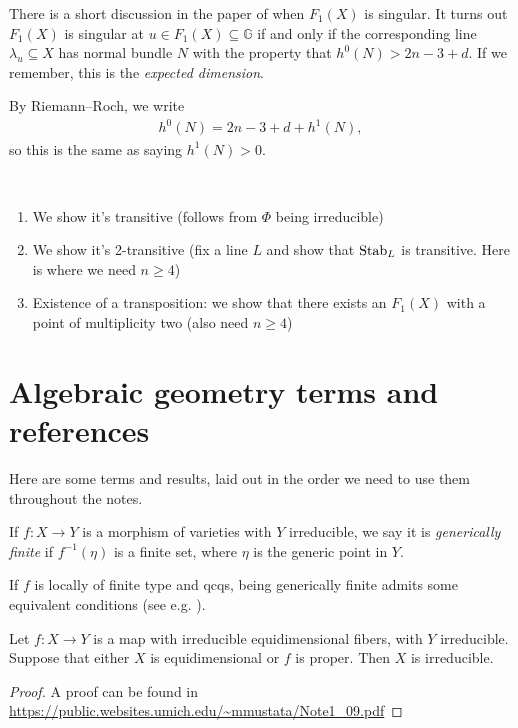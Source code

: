 \documentclass[11pt]{amsart}
\begin{document}
\begin{remark} There is a short discussion in the paper of when $F_1(X)$ is singular. It turns out $F_1(X)$ is singular at $u \in F_1(X) \subseteq \mathbb{G}$ if and only if the corresponding line $\lambda_u \subseteq X$ has normal bundle $N$ with the property that $h^0(N) > 2n-3+d$. If we remember, this is the \textit{expected dimension}.

By Riemann--Roch, we write
\begin{align*}
    h^0(N) = 2n-3+d + h^1(N),
\end{align*}
so this is the same as saying $h^1(N)>0$.
\end{remark}

\begin{remark} \,
\begin{enumerate}
    \item We show it's transitive (follows from $\Phi$ being irreducible)
    \item We show it's 2-transitive (fix a line $L$ and show that $\mathrm{Stab}_L$ is transitive. Here is where we need $n\ge 4$)
    \item Existence of a transposition: we show that there exists an $F_1(X)$ with a point of multiplicity two (also need $n\ge4$)
\end{enumerate}
\end{remark}



\appendix
\section{Algebraic geometry terms and references}

Here are some terms and results, laid out in the order we need to use them throughout the notes.

\begin{definition}
\label{def:generically-finite}
If $f \colon X \to Y$ is a morphism of varieties with $Y$ irreducible, we say it is \textit{generically finite} if $f^{-1}(\eta)$ is a finite set, where $\eta$ is the generic point in $Y$.
\end{definition}

\begin{remark} If $f$ is locally of finite type and qcqs, being generically finite admits some equivalent conditions (see e.g. \cite[02NW]{Stacks}).
\end{remark}

\begin{proposition}\label{prop:irred-criterion}
Let $f\colon X\to Y$ is a map with irreducible equidimensional fibers, with $Y$ irreducible. Suppose that either $X$ is equidimensional or $f$ is proper. Then $X$ is irreducible.
\end{proposition}
\begin{proof} A proof can be found in \url{https://public.websites.umich.edu/~mmustata/Note1_09.pdf}
\end{proof}




\printbibliography
\end{document}
